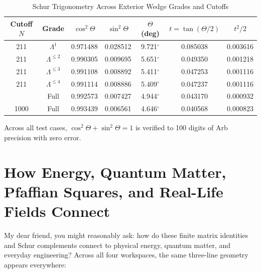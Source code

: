 \documentclass[11pt,a4paper]{article}
\theoremstyle{definition}
\begin{document}
\begin{table}[htbp]
\centering
\caption{Schur Trigonometry Across Exterior Wedge Grades and Cutoffs}
\begin{tabular}{ccccccc}
\toprule
Cutoff $N$ & Grade & $\cos^2\Theta$ & $\sin^2\Theta$ & $\Theta$ (deg) & $t = \tan(\Theta/2)$ & $t^2 / 2$ \\
\midrule
211 & $\Lambda^1$ & 0.971488 & 0.028512 & 9.721$^\circ$ & 0.085038 & 0.003616 \\
211 & $\Lambda^{\le 2}$ & 0.990305 & 0.009695 & 5.651$^\circ$ & 0.049350 & 0.001218 \\
211 & $\Lambda^{\le 3}$ & 0.991108 & 0.008892 & 5.411$^\circ$ & 0.047253 & 0.001116 \\
211 & $\Lambda^{\le 4}$ & 0.991114 & 0.008886 & 5.409$^\circ$ & 0.047237 & 0.001116 \\
\addlinespace
500 & Full & 0.992573 & 0.007427 & 4.944$^\circ$ & 0.043170 & 0.000932 \\
1000 & Full & 0.993439 & 0.006561 & 4.646$^\circ$ & 0.040568 & 0.000823 \\
\bottomrule
\end{tabular}
\end{table}

\noindent Across all test cases, $\cos^2\Theta + \sin^2\Theta = 1$ is verified to 100 digits of Arb precision with zero error.



\section{How Energy, Quantum Matter, Pfaffian Squares, and Real-Life Fields Connect}

My dear friend, you might reasonably ask: how do these finite matrix identities and Schur complements connect to physical energy, quantum matter, and everyday engineering? Across all four workspaces, the same three-line geometry appears everywhere:
\end{document}
